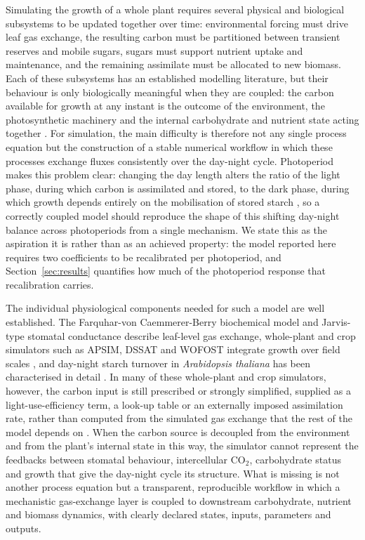 \documentclass[a4paper,fleqn]{cas-sc}
\begin{document}
Simulating the growth of a whole plant requires several physical and biological subsystems to be updated together over time: environmental forcing must drive leaf gas exchange, the resulting carbon must be partitioned between transient reserves and mobile sugars, sugars must support nutrient uptake and maintenance, and the remaining assimilate must be allocated to new biomass. Each of these subsystems has an established modelling literature, but their behaviour is only biologically meaningful when they are coupled: the carbon available for growth at any instant is the outcome of the environment, the photosynthetic machinery and the internal carbohydrate and nutrient state acting together \cite{Farquhar1980,ThornleyJohnson1990}. For simulation, the main difficulty is therefore not any single process equation but the construction of a stable numerical workflow in which these processes exchange fluxes consistently over the day-night cycle. Photoperiod makes this problem clear: changing the day length alters the ratio of the light phase, during which carbon is assimilated and stored, to the dark phase, during which growth depends entirely on the mobilisation of stored starch \cite{Scialdone2013,Graf2010}, so a correctly coupled model should reproduce the shape of this shifting day-night balance across photoperiods from a single mechanism. We state this as the aspiration it is rather than as an achieved property: the model reported here requires two coefficients to be recalibrated per photoperiod, and Section~\ref{sec:results} quantifies how much of the photoperiod response that recalibration carries.

The individual physiological components needed for such a model are well established. The Farquhar-von Caemmerer-Berry biochemical model \cite{Farquhar1980} and Jarvis-type stomatal conductance \cite{Jarvis1976} describe leaf-level gas exchange, whole-plant and crop simulators such as APSIM, DSSAT and WOFOST integrate growth over field scales \cite{Holzworth2014,Jones2003,deWit2019}, and day-night starch turnover in \textit{Arabidopsis thaliana} has been characterised in detail \cite{Scialdone2013,Stitt2012}. In many of these whole-plant and crop simulators, however, the carbon input is still prescribed or strongly simplified, supplied as a light-use-efficiency term, a look-up table or an externally imposed assimilation rate, rather than computed from the simulated gas exchange that the rest of the model depends on \cite{Jones2003,deWit2019}. When the carbon source is decoupled from the environment and from the plant's internal state in this way, the simulator cannot represent the feedbacks between stomatal behaviour, intercellular CO$_2$, carbohydrate status and growth that give the day-night cycle its structure. What is missing is not another process equation but a transparent, reproducible workflow in which a mechanistic gas-exchange layer is coupled to downstream carbohydrate, nutrient and biomass dynamics, with clearly declared states, inputs, parameters and outputs.
\end{document}
